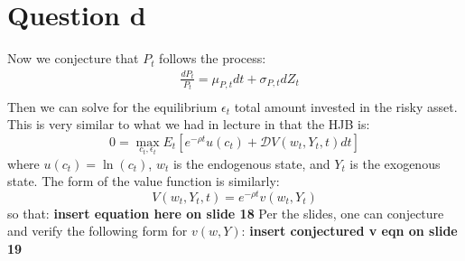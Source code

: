 \documentclass{article}
\begin{document}
\section*{Question d}
Now we conjecture that $P_t$ follows the process:
\[
\begin{aligned}
    &\frac{d P_{t}}{P_{t}}=\mu_{P, t} d t+\sigma_{P, t} d Z_{t}\\
\end{aligned}
\]
Then we can solve for the equilibrium $\epsilon_t$ total amount invested in the risky asset. This is very similar to what we had in lecture in that the HJB is:
\[
0 = \max_{c_t, \epsilon_t}E_t[e^{-\rho t}u(c_t) + \mathcal{D} V(w_t, Y_t, t) d t]    
\]
where $u(c_t) = \ln(c_t) $, $w_t$ is the endogenous state, and $Y_t$ is the exogenous state. The form of the value function is similarly:
\[
V(w_t, Y_t, t) = e^{-\rho t} v(w_t, Y_t)    
\]
so that:
\textbf{insert equation here on slide 18} 
Per the slides, one can conjecture and verify the following form for $v(w, Y)$:
\textbf{insert conjectured v eqn on slide 19}
\end{document}

